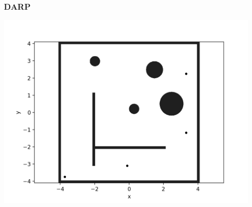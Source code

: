 \documentclass{beamer}
\begin{document}
	\begin{frame}
		\frametitle{DARP}
		\includegraphics[width=\linewidth]{DARPImages/World_with_robots}

	\end{frame}
\end{document}
